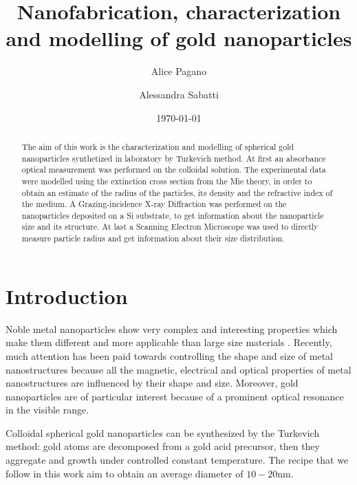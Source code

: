 \documentclass[prb,twocolumn]{revtex4-1}
\begin{document}
\title{Nanofabrication, characterization and modelling of gold nanoparticles} 

\author{Alice Pagano}
\author{Alessandra Sabatti}


\date{\today}

\begin{abstract}

The aim of this work is the characterization and modelling of spherical gold nanoparticles synthetized in laboratory by Turkevich method.
At first an absorbance optical measurement was performed on the colloidal solution. The experimental data were modelled using the extinction cross section from the Mie theory, in order to obtain an estimate of the radius of the particles, its density and the refractive index of the medium.
A Grazing-incidence X-ray Diffraction was performed on the nanoparticles deposited on a Si substrate, to get information about the nanoparticle size and its structure.
At last a Scanning Electron Microscope was used to directly measure particle radius and get information about their size distribution.



\end{abstract}

\maketitle


\section{Introduction}

Noble metal nanoparticles show very complex and interesting properties which make them different and more applicable than large size materials \cite{Scaffardi_2006}.
Recently, much attention has been paid towards controlling the shape and size of metal nanostructures because all the magnetic, electrical and optical properties of metal nanostructures are influenced by their shape and size.
Moreover,  gold nanoparticles are of particular interest because of a prominent optical resonance in the visible range.

Colloidal spherical gold nanoparticles can be synthesized by the Turkevich method: gold atoms are decomposed from a gold acid precursor, then they aggregate and growth under controlled constant temperature. The recipe that we follow in this work aim to obtain an average diameter of \(10-20 \text{nm} \).
\end{document}
